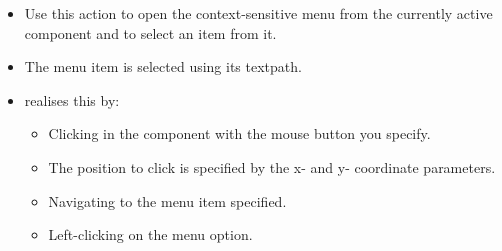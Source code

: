 
\begin{itemize}
\item Use this action to open the context-sensitive menu from the currently active component and to select an item from it.
\item The menu item is selected using its textpath. 
\item \gd{} realises this by:
\begin{itemize}
\item Clicking in the component with the mouse button you specify.
\item The position to click is specified by the x- and y- coordinate parameters.
\item Navigating to the menu item specified.
\item Left-clicking on the menu option.  
\end{itemize}
\end{itemize}


